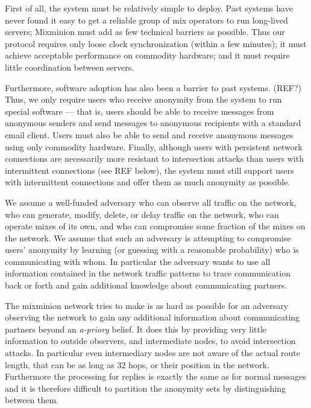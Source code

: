 \documentclass[11pt]{IEEEtran}
\begin{document}
First of all, the system must be relatively simple to deploy.  Past
systems have never found it easy to get a reliable group of mix
operators to run long-lived servers; Mixminion must add as few
technical barriers as possible.  Thus our protocol
requires only loose clock synchronization (within a few minutes);
it must achieve acceptable performance on commodity hardware; and
it must require little coordination between servers.

Furthermore, software adoption has also been a barrier to past
systems. (REF?) Thus, we only require users who receive anonymity
from the system to run special software --- that is, users should
be able to receive messages from anonymous senders and send messages
to anonymous recipients with a standard email
client.  Users must also be able to send and receive anonymous
messages using only commodity hardware.  Finally, although users with
persistent network connections are necessarily more resistant to
intersection attacks than users with intermittent connections (see
REF below), the system must still support users with intermittent
connections and offer them as much anonymity as possible.

We assume a well-funded adversary who can
observe all traffic on the network, who can generate, modify,
delete, or delay traffic on the network, who can operate mixes of its
own, and who can compromise some fraction of the mixes on the network.
We assume that such an adversary is attempting to compromise users'
anonymity by learning (or guessing with a reasonable probability) who
is communicating with whom. In particular the adversary wants to use
all information contained in the network traffic patterns to trace
communication back or forth and gain additional knowledge about
communicating partners.

The mixminion network tries to make is as hard as possible for an
adversary observing the network to gain any additional information
about communicating partners beyond an \emph{a-priory} belief. It does
this by providing very little information to outside observers, and
intermediate nodes, to avoid intersection attacks. In particular even
intermediary nodes are not aware of the actual route length, that can
be as long as 32 hops, or their position in the network. Furthermore
the processing for replies is exactly the same as for normal messages
and it is therefore difficult to partition the anonymity sets by
distinguishing between them. 
\end{document}
